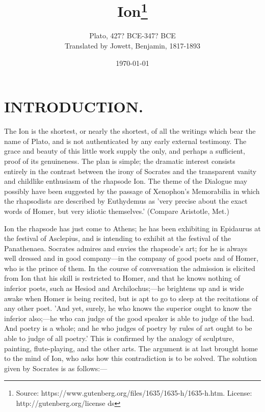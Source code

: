\documentclass[11pt,letter]{article}
\begin{document}
\title{Ion\thanks{Source: https://www.gutenberg.org/files/1635/1635-h/1635-h.htm. License: http://gutenberg.org/license ds}}
\date{\today}
\author{Plato, 427? BCE-347? BCE\\ Translated by Jowett, Benjamin, 1817-1893}
\maketitle

\setcounter{tocdepth}{1}
\tableofcontents
\renewcommand{\baselinestretch}{1.0}
\normalsize
\newpage

\section{
      INTRODUCTION.
    }
\par  The Ion is the shortest, or nearly the shortest, of all the writings which bear the name of Plato, and is not authenticated by any early external testimony. The grace and beauty of this little work supply the only, and perhaps a sufficient, proof of its genuineness. The plan is simple; the dramatic interest consists entirely in the contrast between the irony of Socrates and the transparent vanity and childlike enthusiasm of the rhapsode Ion. The theme of the Dialogue may possibly have been suggested by the passage of Xenophon's Memorabilia in which the rhapsodists are described by Euthydemus as 'very precise about the exact words of Homer, but very idiotic themselves.' (Compare Aristotle, Met.)

\par  Ion the rhapsode has just come to Athens; he has been exhibiting in Epidaurus at the festival of Asclepius, and is intending to exhibit at the festival of the Panathenaea. Socrates admires and envies the rhapsode's art; for he is always well dressed and in good company—in the company of good poets and of Homer, who is the prince of them. In the course of conversation the admission is elicited from Ion that his skill is restricted to Homer, and that he knows nothing of inferior poets, such as Hesiod and Archilochus;—he brightens up and is wide awake when Homer is being recited, but is apt to go to sleep at the recitations of any other poet. 'And yet, surely, he who knows the superior ought to know the inferior also;—he who can judge of the good speaker is able to judge of the bad. And poetry is a whole; and he who judges of poetry by rules of art ought to be able to judge of all poetry.' This is confirmed by the analogy of sculpture, painting, flute-playing, and the other arts. The argument is at last brought home to the mind of Ion, who asks how this contradiction is to be solved. The solution given by Socrates is as follows:—
\end{document}
